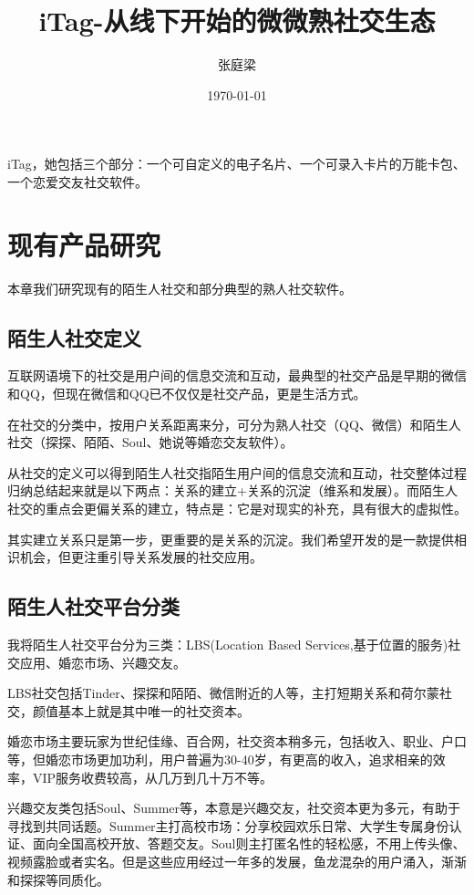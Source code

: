 \documentclass[UTF8]{ctexart}
\title{iTag-从线下开始的微微熟社交生态}
\author{张庭梁}
\date{\today}
\begin{document}
\maketitle

iTag，她包括三个部分：一个可自定义的电子名片、一个可录入卡片的万能卡包、一个恋爱交友社交软件。

\section{现有产品研究}
本章我们研究现有的陌生人社交和部分典型的熟人社交软件。

\subsection{陌生人社交定义}

\begin{tcolorbox}
    互联网语境下的社交是用户间的信息交流和互动，最典型的社交产品是早期的微信和QQ，但现在微信和QQ已不仅仅是社交产品，更是生活方式。

    在社交的分类中，按用户关系距离来分，可分为熟人社交（QQ、微信）和陌生人社交（探探、陌陌、Soul、她说等婚恋交友软件）。

    从社交的定义可以得到陌生人社交指陌生用户间的信息交流和互动，社交整体过程归纳总结起来就是以下两点：关系的建立+关系的沉淀（维系和发展）。而陌生人社交的重点会更偏关系的建立，特点是：它是对现实的补充，具有很大的虚拟性。\cite{StrangerDefine}
\end{tcolorbox}

其实建立关系只是第一步，更重要的是关系的沉淀。我们希望开发的是一款提供相识机会，但更注重引导关系发展的社交应用。

\subsection{陌生人社交平台分类}
我将陌生人社交平台分为三类：LBS(Location Based Services,基于位置的服务)社交应用、婚恋市场、兴趣交友。

LBS社交包括Tinder、探探和陌陌、微信附近的人等，主打短期关系和荷尔蒙社交，颜值基本上就是其中唯一的社交资本。

婚恋市场主要玩家为世纪佳缘、百合网，社交资本稍多元，包括收入、职业、户口等，但婚恋市场更加功利，用户普遍为30-40岁，有更高的收入，追求相亲的效率，VIP服务收费较高，从几万到几十万不等。

兴趣交友类包括Soul、Summer等，本意是兴趣交友，社交资本更为多元，有助于寻找到共同话题。Summer主打高校市场：分享校园欢乐日常、大学生专属身份认证、面向全国高校开放、答题交友。Soul则主打匿名性的轻松感，不用上传头像、视频露脸或者实名。但是这些应用经过一年多的发展，鱼龙混杂的用户涌入，渐渐和探探等同质化。
\end{document}
